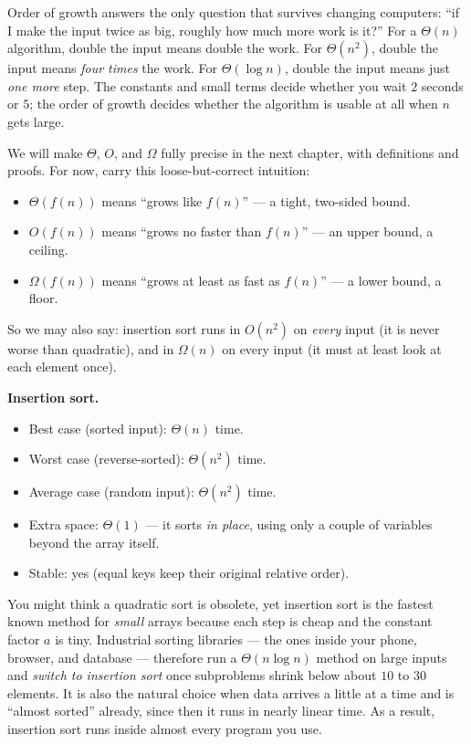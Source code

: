 \begin{intuitionbox}
Order of growth answers the only question that survives changing computers: ``if I make
the input twice as big, roughly how much more work is it?'' For a $\Theta(n)$ algorithm,
double the input means double the work. For $\Theta(n^2)$, double the input means
\emph{four times} the work. For $\Theta(\log n)$, double the input means just \emph{one
more} step. The constants and small terms decide whether you wait $2$ seconds or $5$;
the order of growth decides whether the algorithm is usable at all when $n$ gets large.
\end{intuitionbox}

We will make $\Theta$, $O$, and $\Omega$ fully precise in the next chapter, with
definitions and proofs. For now, carry this loose-but-correct intuition:
\begin{itemize}
  \item $\Theta(f(n))$ means ``grows like $f(n)$'' --- a tight, two-sided bound.
  \item $O(f(n))$ means ``grows no faster than $f(n)$'' --- an upper bound, a ceiling.
  \item $\Omega(f(n))$ means ``grows at least as fast as $f(n)$'' --- a lower bound, a
        floor.
\end{itemize}
So we may also say: insertion sort runs in $O(n^2)$ on \emph{every} input (it is never
worse than quadratic), and in $\Omega(n)$ on every input (it must at least look at each
element once).

\begin{complexitybox}
\textbf{Insertion sort.}
\begin{itemize}
  \item Best case (sorted input): $\Theta(n)$ time.
  \item Worst case (reverse-sorted): $\Theta(n^2)$ time.
  \item Average case (random input): $\Theta(n^2)$ time.
  \item Extra space: $\Theta(1)$ --- it sorts \emph{in place}, using only a couple of
        variables beyond the array itself.
  \item Stable: yes (equal keys keep their original relative order).
\end{itemize}
\end{complexitybox}

\begin{aestheticbox}
You might think a quadratic sort is obsolete, yet insertion sort is the fastest
known method for \emph{small} arrays because each step is cheap and the constant
factor $a$ is tiny. Industrial sorting libraries --- the ones inside your phone,
browser, and database --- therefore run a $\Theta(n\log n)$ method on large
inputs and \emph{switch to insertion sort} once subproblems shrink below about
$10$ to $30$ elements. It is also the natural choice when data arrives a little at
a time and is ``almost sorted'' already, since then it runs in nearly linear time. As a
result, insertion sort runs inside almost every program you use.
\end{aestheticbox}

